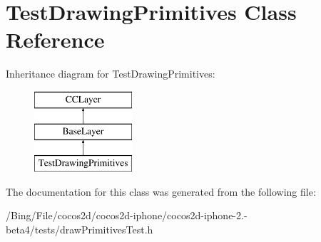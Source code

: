 \hypertarget{interface_test_drawing_primitives}{\section{Test\-Drawing\-Primitives Class Reference}
\label{interface_test_drawing_primitives}
}
Inheritance diagram for Test\-Drawing\-Primitives\-:\begin{figure}[H]
\begin{center}
\leavevmode
\includegraphics[height=3.000000cm]{interface_test_drawing_primitives}
\end{center}
\end{figure}


The documentation for this class was generated from the following file\-:\begin{DoxyCompactItemize}
\item 
/\-Bing/\-File/cocos2d/cocos2d-\/iphone/cocos2d-\/iphone-\/2.-\/beta4/tests/draw\-Primitives\-Test.\-h\end{DoxyCompactItemize}
